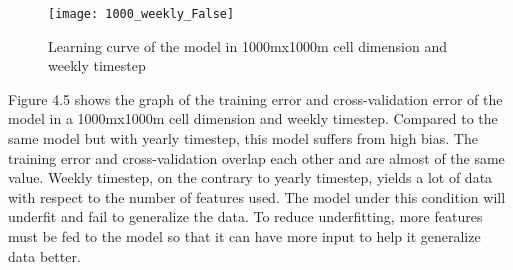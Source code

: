     \begin{figure}[H]
      \centering
      \texttt{[image: 1000\_weekly\_False]}
      \caption{Learning curve of the model in 1000mx1000m cell dimension and weekly timestep}
    \end{figure}
    Figure 4.5 shows the graph of the training error and cross-validation error of the model in a 1000mx1000m cell dimension and weekly timestep. Compared to the same model but with yearly timestep, this model suffers from high bias. The training error and cross-validation overlap each other and are almost of the same value. Weekly timestep, on the contrary to yearly timestep, yields a lot of data with respect to the number of features used. The model under this condition will underfit and fail to generalize the data. To reduce underfitting, more features must be fed to the model so that it can have more input to help it generalize data better.
